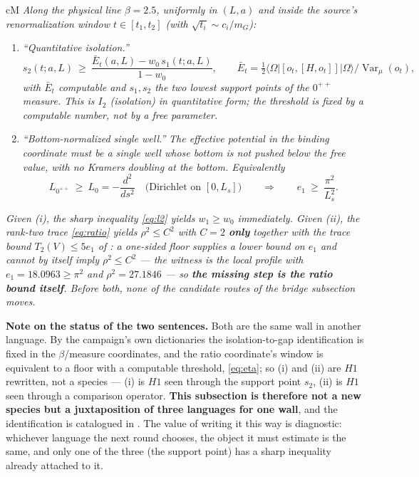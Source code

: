 \begin{claimbox}{cM}
 \emph{Along the physical line $\beta=2.5$,
uniformly in $(L,a)$ and inside the source's renormalization window $t\in[t_1,t_2]$ (with
$\sqrt{t_i}\sim c_i/m_G$):}
\begin{enumerate}
\item[(i)] \emph{``Quantitative isolation.''}
  \[
    s_2(t;a,L)\ \ge\ \frac{\bar E_t(a,L)-w_0\,s_1(t;a,L)}{1-w_0},
    \qquad
    \bar E_t=\tfrac12\bigl\langle\Omega|[o_t,[H,o_t]]|\Omega\bigr\rangle/\operatorname{Var}_\mu(o_t),
  \]
  \emph{with $\bar E_t$ computable and $s_1,s_2$ the two lowest support points of the
  $0^{++}$ measure. This is $I_2$ (isolation) in quantitative form; the threshold is fixed by a
  computable number, not by a free parameter.}
\item[(ii)] \emph{``Bottom-normalized single well.''} \emph{The effective potential in the binding
  coordinate must be a single well whose bottom is not pushed below the free value, with no Kramers
  doubling at the bottom. Equivalently}
  \[
    L_{0^{++}}\ \ge\ L_0=-\frac{d^2}{ds^2}
    \quad\text{(Dirichlet on }[0,L_s]\text{)}
    \qquad\Longrightarrow\qquad
    e_1\ \ge\ \frac{\pi^2}{L_s^2}.
  \]
\end{enumerate}
\emph{Given (i), the sharp inequality \eqref{eq:l2} yields $w_1\ge w_0$ immediately. Given (ii), the
rank-two trace \eqref{eq:ratio} yields $\rho^2\le C^2$ with $C=2$ \textbf{only} together with the
trace bound $T_2(V)\le5e_1$ of : a one-sided floor supplies
a lower bound on $e_1$ and \emph{cannot} by itself imply $\rho^2\le C^2$ --- the witness is the local
profile with $e_1=18.0963\ge\pi^2$ and $\rho^2=27.1846$ --- so \textbf{the missing step is the ratio
bound itself}. Before both, none of the candidate routes of the bridge subsection moves.}
\end{claimbox}

\textbf{Note on the status of the two sentences.} Both are the same wall in another language. By the
campaign's own dictionaries the isolation-to-gap identification is fixed in the $\beta$/measure
coordinates, and the ratio coordinate's window is equivalent to a floor with a computable threshold,
\eqref{eq:eta}; so (i) and (ii) are $H1$ rewritten, not a species --- (i) is $H1$ seen through the
support point $s_2$, (ii) is $H1$ seen through a comparison operator. \textbf{This subsection is
therefore not a new species but a juxtaposition of three languages for one wall}, and the
identification is catalogued in  \LC. The value of writing it this
way is diagnostic: whichever language the next round chooses, the object it must estimate is the
same, and only one of the three (the support point) has a sharp inequality already attached to it.

